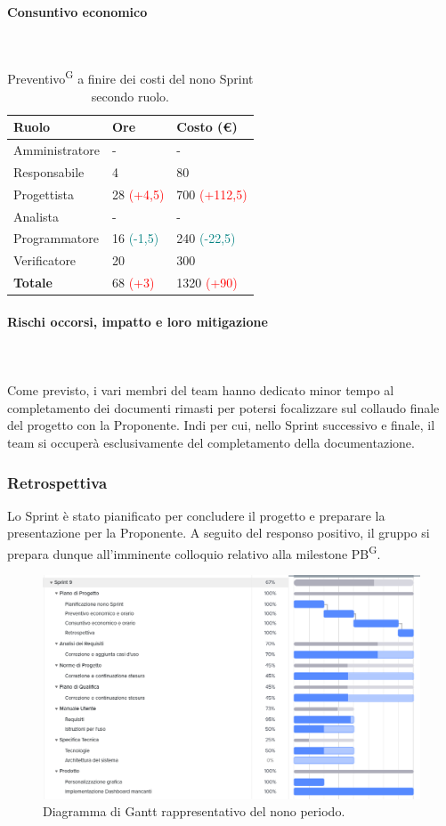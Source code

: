 \documentclass[8pt]{article}
\newcommand{\glossterm}[1]{#1\textsuperscript{G}} %
\newcommand{\subsubsubsection}[1]{\paragraph{#1}\mbox{}\\}
\begin{document}
\subsubsubsection{Consuntivo economico}
\begin{table}[ht!]
    \centering
    \begin{tabular}{p{4cm} p{1.8cm} p{2.2cm}}
        \toprule
        \textbf{Ruolo} & \textbf{Ore} & \textbf{Costo (€)} \\
        \midrule
        Amministratore & - & - \\ 
        Responsabile & 4 & 80 \\ 
        Progettista & 28 \textcolor{red}{(+4,5)} & 700 \textcolor{red}{(+112,5)} \\ 
        Analista & - & - \\ 
        Programmatore & 16 \textcolor{teal}{(-1,5)} & 240 \textcolor{teal}{(-22,5)} \\ 
        Verificatore & 20 & 300 \\ 
        \midrule
        \textbf{Totale} & 68 \textcolor{red}{(+3)} & 1320 \textcolor{red}{(+90)} \\ 
        \bottomrule
    \end{tabular}
    \caption{\glossterm{Preventivo} a finire dei costi del nono Sprint secondo ruolo.}
    \label{table:Preventivo a finire dei costi del non Sprint secondo ruolo}
\end{table}
\subsubsubsection{Rischi occorsi, impatto e loro mitigazione} \\
Come previsto, i vari membri del team hanno dedicato minor tempo al completamento dei documenti rimasti per potersi focalizzare sul collaudo finale del progetto con la Proponente. Indi per cui, nello Sprint successivo e finale, il team si occuperà esclusivamente del completamento della documentazione.
\subsubsection{Retrospettiva}
Lo Sprint è stato pianificato per concludere il progetto e preparare la presentazione per la Proponente. A seguito del responso positivo, il gruppo si prepara dunque all'imminente colloquio relativo alla milestone \glossterm{PB}. 
\begin{figure}[h!]
    \centering
    \includegraphics[width=13cm]{./images_pdp/gantt9.png}
    \caption{Diagramma di Gantt rappresentativo del nono periodo.}
\end{figure}
\clearpage
\newpage
\end{document}
